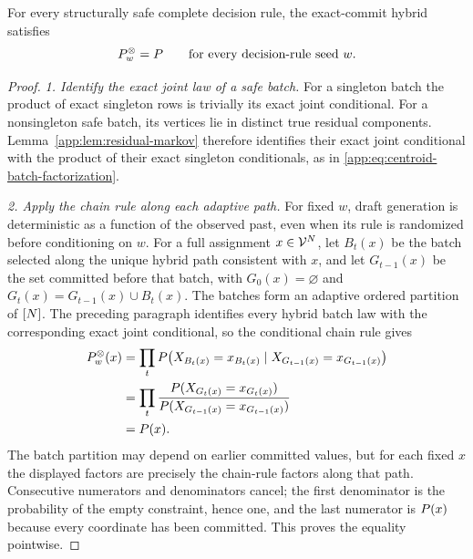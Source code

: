 \begin{lemma}
\label{app:lem:exact-hybrid}
For every structurally safe complete decision rule, the exact-commit hybrid
satisfies
\begin{equation}
 P_{w}^{\otimes}=P
 \qquad\text{for every decision-rule seed }w.
 \label{app:eq:exact-hybrid-target}
\end{equation}
\end{lemma}

\begin{proof}

\emph{1. Identify the exact joint law of a safe batch.}
For a singleton batch the product of exact singleton rows is trivially its
exact joint conditional.  For a nonsingleton safe batch, its vertices lie in
distinct true residual components.  Lemma~\ref{app:lem:residual-markov}
therefore identifies their exact joint conditional with the product of their
exact singleton conditionals, as in
\eqref{app:eq:centroid-batch-factorization}.


\emph{2. Apply the chain rule along each adaptive path.}
For fixed $w$, draft generation is deterministic as a function of the observed
past, even when its rule is randomized before conditioning on $w$.
For a full assignment $x\in\mathcal V^N$, let $B_t(x)$ be the batch selected along
the unique hybrid path consistent with $x$, and let $G_{t-1}(x)$ be the set
committed before that batch, with $G_0(x)=\varnothing$ and
$G_t(x)=G_{t-1}(x)\cup B_t(x)$.  The batches form an adaptive ordered partition
of $[N]$.  The preceding paragraph identifies every hybrid batch law
with the corresponding exact joint conditional, so the conditional chain
rule gives
\begin{align}
 P_{w}^{\otimes}(x)
 &=\prod_t
 P\!\left(
  X_{B_t(x)}=x_{B_t(x)}
 \mid X_{G_{t-1}(x)}=x_{G_{t-1}(x)}
 \right)\notag\\
 &=\prod_t
 \frac{P(X_{G_t(x)}=x_{G_t(x)})}
      {P(X_{G_{t-1}(x)}=x_{G_{t-1}(x)})}\notag\\
 &=P(x).
 \label{app:eq:adaptive-exact-chain-rule}
\end{align}
The batch partition may depend on earlier committed values, but for each fixed
$x$ the displayed factors are precisely the chain-rule factors along that
path.  Consecutive numerators and denominators cancel; the first denominator
is the probability of the empty constraint, hence one, and the last numerator
is $P(x)$ because every coordinate has been committed.
This proves the equality pointwise.
\end{proof}

